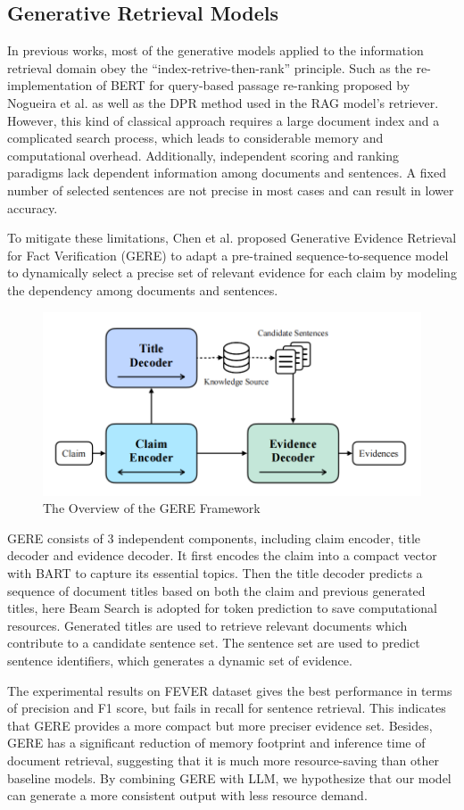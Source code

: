 \documentclass{article}
\begin{document}
\subsection{Generative Retrieval Models}
In previous works, most of the generative models applied to the information retrieval domain obey the “index-retrive-then-rank” principle. Such as the re-implementation of BERT for query-based passage re-ranking proposed by Nogueira et al. \cite{nogueira2019passage} as well as the DPR \cite{karpukhin2020dense} method used in the RAG model’s retriever. However, this kind of classical approach requires a large document index and a complicated search process, which leads to considerable memory and computational overhead. Additionally, independent scoring and ranking paradigms lack dependent information among documents and sentences. A fixed number of selected sentences are not precise in most cases and can result in lower accuracy.  \par
To mitigate these limitations, Chen et al. \cite{chen2022gere} proposed Generative Evidence Retrieval for Fact Verification (GERE) to adapt a pre-trained sequence-to-sequence model to dynamically select a precise set of relevant evidence for each claim by modeling the dependency among documents and sentences. 

\begin{figure}[h]
  \centering
  \includegraphics[width=0.5\linewidth]{Figure/Fig4.png}
  \caption{The Overview of the GERE Framework}
\end{figure}

GERE consists of 3 independent components, including claim encoder, title decoder and evidence decoder. It first encodes the claim into a compact vector with BART to capture its essential topics. Then the title decoder predicts a sequence of document titles based on both the claim and previous generated titles, here Beam Search is adopted for token prediction to save computational resources. Generated titles are used to retrieve relevant documents which contribute to a candidate sentence set. The sentence set are used to predict sentence identifiers, which generates a dynamic set of evidence. \par
The experimental results on FEVER dataset \cite{thorne2018fever} gives the best performance in terms of precision and F1 score, but fails in recall for sentence retrieval. This indicates that GERE provides a more compact but more preciser evidence set. Besides, GERE has a significant reduction of memory footprint and inference time of document retrieval, suggesting that it is much more resource-saving than other baseline models. By combining GERE with LLM, we hypothesize that our model can generate a more consistent output with less resource demand.
\end{document}
